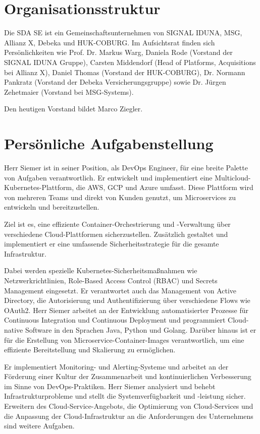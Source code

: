\section{Organisationsstruktur}
\label{sec:intro:organisationsstruktur}
Die SDA SE ist ein Gemeinschaftsunternehmen von SIGNAL IDUNA, MSG, Allianz X, Debeka und HUK-COBURG.
Im Aufsichtsrat finden sich Persönlichkeiten wie Prof. Dr. Markus Warg, Daniela Rode (Vorstand der SIGNAL IDUNA Gruppe), Carsten Middendorf (Head of Platforms, Acquisitions bei Allianz X), Daniel Thomas (Vorstand der HUK-COBURG), Dr. Normann Pankratz (Vorstand der Debeka Versicherungsgruppe) sowie Dr. Jürgen Zehetmaier (Vorstand bei MSG-Systems).
\medskip

\noindent
Den heutigen Vorstand bildet Marco Ziegler.

\section{Persönliche Aufgabenstellung}
\label{sec:intro:persoenliche-aufgabenstellung}
Herr Siemer ist in seiner Position, als DevOps Engineer, für eine breite Palette von Aufgaben verantwortlich.
Er entwickelt und implementiert eine Multicloud-Kubernetes-Plattform, die AWS, GCP und Azure umfasst.
Diese Plattform wird von mehreren Teams und direkt von Kunden genutzt, um Microservices zu entwickeln und bereitzustellen.
\medskip

\noindent
Ziel ist es, eine effiziente Container-Orchestrierung und -Verwaltung über verschiedene Cloud-Plattformen sicherzustellen.
Zusätzlich gestaltet und implementiert er eine umfassende Sicherheitsstrategie für die gesamte Infrastruktur.
\medskip

\noindent
Dabei werden spezielle Kubernetes-Sicherheitsmaßnahmen wie Netzwerkrichtlinien, Role-Based Access Control (RBAC) und Secrets Management eingesetzt.
Er verantwortet auch das Management von Active Directory, die Autorisierung und Authentifizierung über verschiedene Flows wie OAuth2.
Herr Siemer arbeitet an der Entwicklung automatisierter Prozesse für Continuous Integration und Continuous Deployment und programmiert Cloud-native Software in den Sprachen Java, Python und Golang.
Darüber hinaus ist er für die Erstellung von Microservice-Container-Images verantwortlich, um eine effiziente Bereitstellung und Skalierung zu ermöglichen.
\medskip

\noindent
Er implementiert Monitoring- und Alerting-Systeme und arbeitet an der Förderung einer Kultur der Zusammenarbeit und kontinuierlichen Verbesserung im Sinne von DevOps-Praktiken.
Herr Siemer analysiert und behebt Infrastrukturprobleme und stellt die Systemverfügbarkeit und -leistung sicher.
Erweitern des Cloud-Service-Angebots, die Optimierung von Cloud-Services und die Anpassung der Cloud-Infrastruktur an die Anforderungen des Unternehmens sind weitere Aufgaben.
